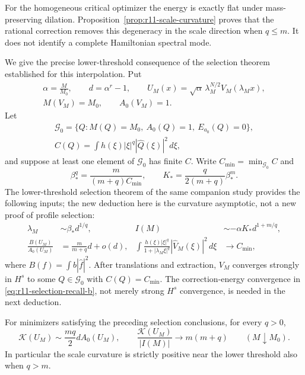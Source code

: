 For the homogeneous critical optimizer the energy is exactly flat
under mass-preserving dilation.  Proposition~\ref{prop:r11-scale-curvature}
proves that the rational correction removes this degeneracy in the
scale direction when $q\le m$.  It does not identify a complete
Hamiltonian spectral mode.

We give the precise lower-threshold consequence of the selection theorem
established for this interpolation.  Put
\[
 \begin{gathered}
 \alpha=\frac{M}{M_0},\qquad d=\alpha^r-1,\qquad
 U_M(x)=\sqrt\alpha\,\lambda_M^{N/2}V_M(\lambda_Mx),\\
 M(V_M)=M_0,\qquad A_0(V_M)=1.
 \end{gathered}
\]
Let
\[
 \begin{gathered}
 \mathcal G_0=\{Q:M(Q)=M_0,\ A_0(Q)=1,\ E_{a_0}(Q)=0\},\\
 C(Q)=\int h(\xi)|\xi|^q|\widehat Q(\xi)|^2\,d\xi,
 \end{gathered}
\]
and suppose at least one element of $\mathcal G_0$ has finite $C$.
Write $C_{\min}=\min_{\mathcal G_0}C$ and
\[
 \beta_*^q=\frac{m}{(m+q)C_{\min}},\qquad
 K_* =\frac{q}{2(m+q)}\beta_*^m.
\]
The lower-threshold selection theorem of the same companion study
provides the following inputs; the new deduction here is the curvature
asymptotic, not a new proof of profile selection:
\begin{align}
 \lambda_M&\sim\beta_*d^{1/q},&
 I(M)&\sim-\alpha K_*d^{1+m/q},
       \label{eq:r11-selection-recall-a}\\
 \frac{B(U_M)}{A_0(U_M)}&=\frac{m}{m+q}d+o(d),&
 \int\frac{h(\xi)|\xi|^q}{1+|\lambda_M\xi|^q}
                |\widehat V_M(\xi)|^2\,d\xi&\longrightarrow C_{\min},
       \label{eq:r11-selection-recall-b}
\end{align}
where $B(f)=\int b|\widehat f|^2$.  After translations and extraction,
$V_M$ converges strongly in $H^s$ to some $Q\in\mathcal G_0$ with
$C(Q)=C_{\min}$.  The correction-energy convergence in
\eqref{eq:r11-selection-recall-b}, not merely strong $H^s$
convergence, is needed in the next deduction.

\begin{corollary}
\label{cor:r11-curvature-asymptotic}
For minimizers satisfying the preceding selection conclusions, for
every $q>0$,
\begin{equation}\label{eq:r11-curvature-asymptotic}
 \mathcal K(U_M)\sim\frac{mq}{2}dA_0(U_M),\qquad
 \frac{\mathcal K(U_M)}{|I(M)|}\longrightarrow m(m+q)
 \qquad(M\downarrow M_0).
\end{equation}
In particular the scale curvature is strictly positive near the lower
threshold also when $q>m$.
\end{corollary}

